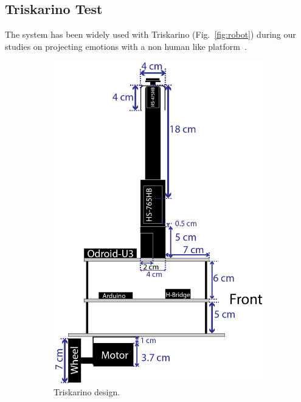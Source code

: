 \subsection{Triskarino Test}
The system has been widely used with Triskarino (Fig.~\ref{fig:robot}) during our studies on projecting emotions with a non human like platform~\cite{angel2017robots}. 
\begin{figure}
	\centering
	\begin{subfigure}[c]{0.16\textwidth}
	\includegraphics[width=\textwidth]{./Images/upperFourthD.png}
	\caption{Triskarino design.}
	\label{fig:design}
	\end{subfigure}
	\begin{subfigure}[c]{0.2\textwidth}

\end{subfigure}
\end{figure}
